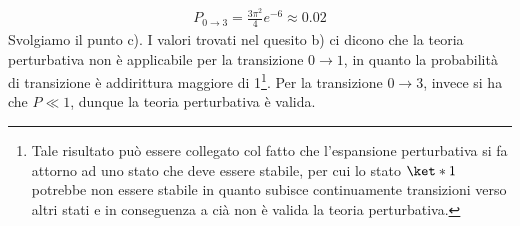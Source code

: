 \begin{soluzione}
\begin{gather*}
      P_{0 \to 3}
      =\frac{3 \pi^2}{4} e^{-6}
      \approx 0.02
   \end{gather*}
   Svolgiamo il punto c). I valori trovati nel quesito b) ci dicono che la teoria perturbativa non è applicabile per la transizione $0 \to 1$, in quanto la probabilità di transizione è addirittura maggiore di 1\footnote{Tale risultato può essere collegato col fatto che l'espansione perturbativa si fa attorno ad uno stato che deve essere stabile, per cui lo stato $\ket*{1}$ potrebbe non essere stabile in quanto subisce continuamente transizioni verso altri stati e in conseguenza a cià non è valida la teoria perturbativa.}. Per la transizione $0 \to 3$, invece si ha che $P \ll 1$, dunque la teoria perturbativa è valida.
\end{soluzione}

\comment{

\newpage
\setcounter{equation}{0}

}
